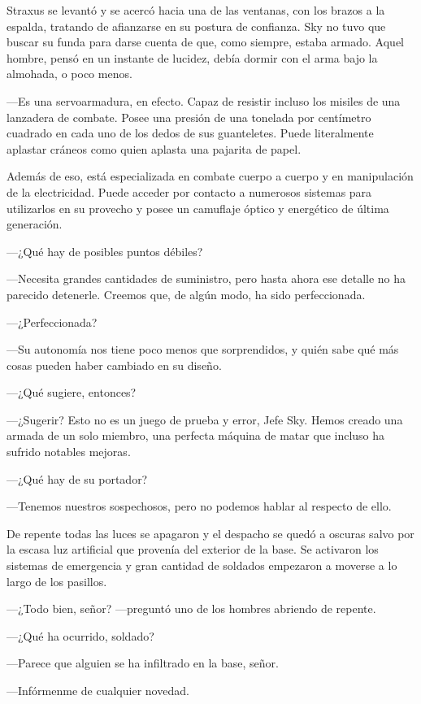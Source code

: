 Straxus se levantó y se acercó hacia una de las ventanas, con los brazos a la espalda, tratando de afianzarse en su postura de confianza. Sky no tuvo que buscar su funda para darse cuenta de que, como siempre, estaba armado. Aquel hombre, pensó en un instante de lucidez, debía dormir con el arma bajo la almohada, o poco menos.

---Es una servoarmadura, en efecto. Capaz de resistir incluso los misiles de una lanzadera de combate. Posee una presión de una tonelada por centímetro cuadrado en cada uno de los dedos de sus guanteletes. Puede literalmente aplastar cráneos como quien aplasta una pajarita de papel.

\rquoti{}Además de eso, está especializada en combate cuerpo a cuerpo y en manipulación de la electricidad. Puede acceder por contacto a numerosos sistemas para utilizarlos en su provecho y posee un camuflaje óptico y energético de última generación.

---¿Qué hay de posibles puntos débiles?

---Necesita grandes cantidades de suministro, pero hasta ahora ese detalle no ha parecido detenerle. Creemos que, de algún modo, ha sido perfeccionada.

---¿Perfeccionada?

---Su autonomía nos tiene poco menos que sorprendidos, y quién sabe qué más cosas pueden haber cambiado en su diseño.

---¿Qué sugiere, entonces?

---¿Sugerir? Esto no es un juego de prueba y error, Jefe Sky. Hemos creado una armada de un solo miembro, una perfecta máquina de matar que incluso ha sufrido notables mejoras.

---¿Qué hay de su portador?

---Tenemos nuestros sospechosos, pero no podemos hablar al respecto de ello.

De repente todas las luces se apagaron y el despacho se quedó a oscuras salvo por la escasa luz artificial que provenía del exterior de la base. Se activaron los sistemas de emergencia y gran cantidad de soldados empezaron a moverse a lo largo de los pasillos.

---¿Todo bien, señor? ---preguntó uno de los hombres abriendo de repente.

---¿Qué ha ocurrido, soldado?

---Parece que alguien se ha infiltrado en la base, señor.

---Infórmenme de cualquier novedad.

